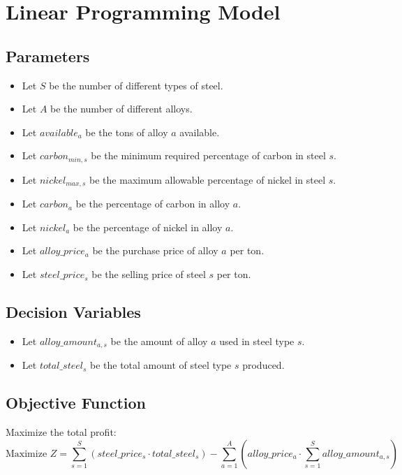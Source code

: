 \documentclass{article}
\begin{document}
\section*{Linear Programming Model}

\subsection*{Parameters}
\begin{itemize}
    \item Let \( S \) be the number of different types of steel.
    \item Let \( A \) be the number of different alloys.
    \item Let \( available_a \) be the tons of alloy \( a \) available.
    \item Let \( carbon_{min,s} \) be the minimum required percentage of carbon in steel \( s \).
    \item Let \( nickel_{max,s} \) be the maximum allowable percentage of nickel in steel \( s \).
    \item Let \( carbon_{a} \) be the percentage of carbon in alloy \( a \).
    \item Let \( nickel_{a} \) be the percentage of nickel in alloy \( a \).
    \item Let \( alloy\_price_{a} \) be the purchase price of alloy \( a \) per ton.
    \item Let \( steel\_price_{s} \) be the selling price of steel \( s \) per ton.
\end{itemize}

\subsection*{Decision Variables}
\begin{itemize}
    \item Let \( alloy\_amount_{a,s} \) be the amount of alloy \( a \) used in steel type \( s \).
    \item Let \( total\_steel_{s} \) be the total amount of steel type \( s \) produced.
\end{itemize}

\subsection*{Objective Function}
Maximize the total profit:
\[
\text{Maximize } Z = \sum_{s=1}^{S} (steel\_price_{s} \cdot total\_steel_{s}) - \sum_{a=1}^{A} (alloy\_price_{a} \cdot \sum_{s=1}^{S} alloy\_amount_{a,s})
\]
\end{document}
